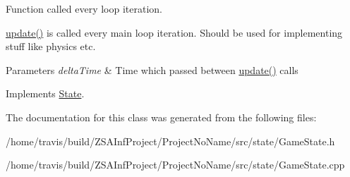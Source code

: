Function called every loop iteration. 

\hyperlink{classGameState_aba059d7ab1a53b8f5d795292ed37abac}{update()} is called every main loop iteration. Should be used for implementing stuff like physics etc. 
\begin{DoxyParams}{Parameters}
{\em delta\-Time} & Time which passed between \hyperlink{classGameState_aba059d7ab1a53b8f5d795292ed37abac}{update()} calls \\
\hline
\end{DoxyParams}


Implements \hyperlink{classState_af2121f8eb52144b7a789214f15e3601a}{State}.



The documentation for this class was generated from the following files\-:\begin{DoxyCompactItemize}
\item 
/home/travis/build/\-Z\-S\-A\-Inf\-Project/\-Project\-No\-Name/src/state/Game\-State.\-h\item 
/home/travis/build/\-Z\-S\-A\-Inf\-Project/\-Project\-No\-Name/src/state/Game\-State.\-cpp\end{DoxyCompactItemize}
